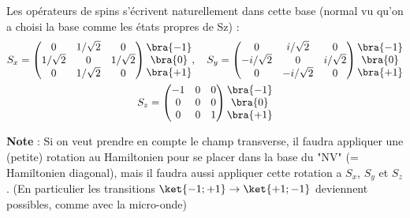 \documentclass[a4paper]{article}
\begin{document}
  Les opérateurs de spins s'écrivent naturellement dans cette base (normal vu qu'on a choisi la base comme les états propres de Sz) : 
  \begin{gather*}
  S_x = \begin{pmatrix}
  0&1/\sqrt{2}&0 \\
  1/\sqrt{2}&0&1/\sqrt{2} \\
  0&1/\sqrt{2}&0
  \end{pmatrix}
  \begin{matrix}
  \bra{-1} \\
  \bra{0} \\
  \bra{+1}
  \end{matrix}  
  , \quad 
  S_y = \begin{pmatrix}
  0&i/\sqrt{2}&0 \\
  -i/\sqrt{2}&0&i/\sqrt{2} \\
  0&-i/\sqrt{2}&0
  \end{pmatrix} 
  \begin{matrix}
  \bra{-1} \\
  \bra{0} \\
  \bra{+1}
  \end{matrix} 
  \\ 
  S_z = \begin{pmatrix}
  -1&0&0 \\
  0&0&0\\
  0&0&1
  \end{pmatrix}
  \begin{matrix}
  \bra{-1} \\
  \bra{0} \\
  \bra{+1}
  \end{matrix}
  \end{gather*}
  
  \textbf{Note} : Si on veut prendre en compte le champ transverse, il faudra appliquer une (petite) rotation au Hamiltonien pour se placer dans la base du "NV" (= Hamiltonien diagonal), mais il faudra aussi appliquer cette rotation a $S_x$, $S_y$ et $S_z$. (En particulier les transitions $\ket{-1;+1} \to \ket{+1;-1}$ deviennent possibles, comme avec la micro-onde)
  
\end{document}
